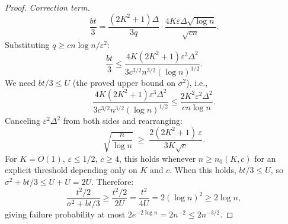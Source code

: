 \documentclass[10pt,a4paper]{amsart}
\newcommand{\eps}{\varepsilon}
\begin{document}
\begin{proof}
\medskip\noindent\emph{Correction term.}
\[
\frac{bt}{3}
= \frac{(2K^2+1)\Delta}{3q} \cdot \frac{4K\eps\Delta\sqrt{\log n}}{\sqrt{cn}}.
\]
Substituting $q \geq cn\log n/\eps^2$:
\[
\frac{bt}{3}
\leq \frac{4K(2K^2+1)\eps^3\Delta^2}{3c^{3/2}n^{3/2}(\log n)^{1/2}}.
\]
We need $bt/3 \leq U$ (the proved upper bound on $\sigma^2$), i.e.,
\[
\frac{4K(2K^2+1)\eps^3\Delta^2}{3c^{3/2}n^{3/2}(\log n)^{1/2}}
\leq \frac{2K^2\eps^2\Delta^2}{cn\log n}.
\]
Canceling $\eps^2\Delta^2$ from both sides and rearranging:
\[
\sqrt{\frac{n}{\log n}}
\;\geq\; \frac{2(2K^2+1)\,\eps}{3K\sqrt{c}}.
\]
For $K = O(1)$, $\eps \leq 1/2$, $c \geq 4$, this holds whenever
$n \geq n_0(K, c)$ for an explicit threshold depending only on $K$ and $c$.
When this holds, $bt/3 \leq U$, so $\sigma^2 + bt/3 \leq U + U = 2U$.
Therefore:
\[
\frac{t^2/2}{\sigma^2 + bt/3}
\geq \frac{t^2/2}{2U}
= \frac{t^2}{4U}
= 2(\log n)^2
\geq 2\log n,
\]
giving failure probability at most $2e^{-2\log n} = 2n^{-2} \leq 2n^{-3/2}$.
\end{proof}
\end{document}

